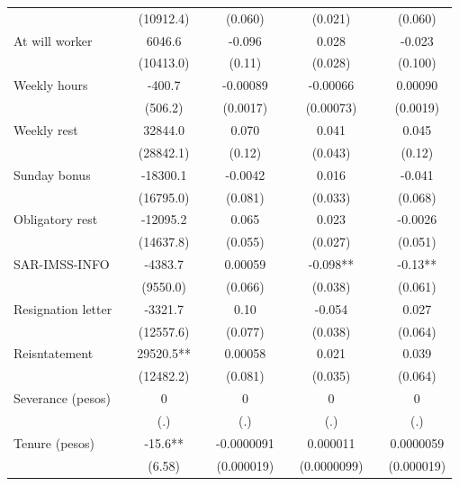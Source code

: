 \begin{tabular}{lcccccccc}
      &       & (10912.4) &       & (0.060) &       & (0.021) &       & (0.060) \\
At will worker &       & 6046.6 &       & -0.096 &       & 0.028 &       & -0.023 \\
      &       & (10413.0) &       & (0.11) &       & (0.028) &       & (0.100) \\
Weekly hours &       & -400.7 &       & -0.00089 &       & -0.00066 &       & 0.00090 \\
      &       & (506.2) &       & (0.0017) &       & (0.00073) &       & (0.0019) \\
Weekly rest &       & 32844.0 &       & 0.070 &       & 0.041 &       & 0.045 \\
      &       & (28842.1) &       & (0.12) &       & (0.043) &       & (0.12) \\
Sunday bonus &       & -18300.1 &       & -0.0042 &       & 0.016 &       & -0.041 \\
      &       & (16795.0) &       & (0.081) &       & (0.033) &       & (0.068) \\
Obligatory rest &       & -12095.2 &       & 0.065 &       & 0.023 &       & -0.0026 \\
      &       & (14637.8) &       & (0.055) &       & (0.027) &       & (0.051) \\
SAR-IMSS-INFO &       & -4383.7 &       & 0.00059 &       & -0.098** &       & -0.13** \\
      &       & (9550.0) &       & (0.066) &       & (0.038) &       & (0.061) \\
Resignation letter &       & -3321.7 &       & 0.10  &       & -0.054 &       & 0.027 \\
      &       & (12557.6) &       & (0.077) &       & (0.038) &       & (0.064) \\
Reisntatement &       & 29520.5** &       & 0.00058 &       & 0.021 &       & 0.039 \\
      &       & (12482.2) &       & (0.081) &       & (0.035) &       & (0.064) \\
Severance (pesos) &       & 0     &       & 0     &       & 0     &       & 0 \\
      &       & (.)   &       & (.)   &       & (.)   &       & (.) \\
Tenure (pesos) &       & -15.6** &       & -0.0000091 &       & 0.000011 &       & 0.0000059 \\
      &       & (6.58) &       & (0.000019) &       & (0.0000099) &       & (0.000019) \\

\end{tabular}

